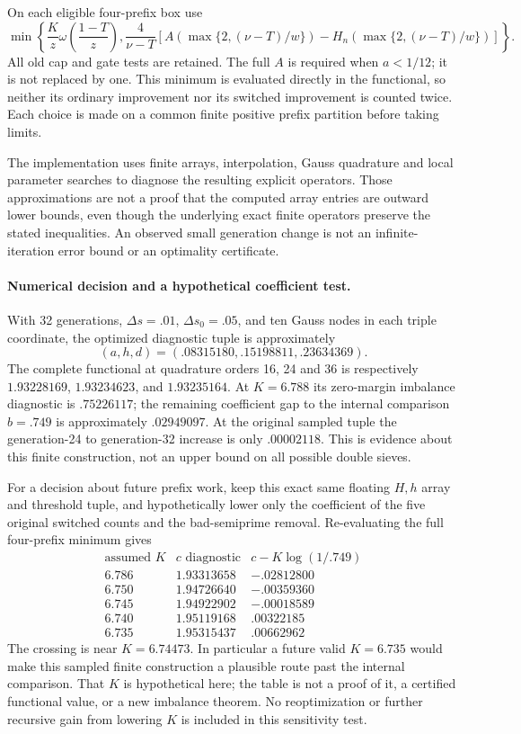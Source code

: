 \documentclass[11pt]{article}
\begin{document}
On each eligible four-prefix box use
\[
 \min\left\{\frac Kz\omega\left(\frac{1-T}{z}\right),
             \frac4{\nu-T}
               \left[A\left(\max\{2,(\nu-T)/w\}\right)
                     -H_n\left(\max\{2,(\nu-T)/w\}\right)\right]
       \right\}.
\]
All old cap and gate tests are retained. The full $A$ is required
when $a<1/12$; it is not replaced by one. This minimum is evaluated
directly in the functional, so neither its ordinary improvement nor
its switched improvement is counted twice. Each choice is made on
a common finite positive prefix partition before taking limits.

The implementation uses finite arrays, interpolation, Gauss
quadrature and local parameter searches to diagnose the resulting
explicit operators. Those approximations are not a proof that the
computed array entries are outward lower bounds, even though the
underlying exact finite operators preserve the stated inequalities.
An observed small generation change is not an infinite-iteration
error bound or an optimality certificate.

\paragraph{Numerical decision and a hypothetical coefficient test.}
With 32 generations, $\Delta s=.01$, $\Delta s_0=.05$, and ten
Gauss nodes in each triple coordinate, the optimized diagnostic tuple
is approximately
\[
 (a,h,d)=(.08315180,.15198811,.23634369).
\]
The complete functional at quadrature orders 16, 24 and 36 is
respectively $1.93228169$, $1.93234623$, and $1.93235164$.
At $K=6.788$ its zero-margin imbalance diagnostic is $.75226117$;
the remaining coefficient gap to the internal comparison $b=.749$
is approximately $.02949097$. At the original sampled tuple the
generation-24 to generation-32 increase is only $.00002118$.
This is evidence about this finite construction, not an upper bound
on all possible double sieves.

For a decision about future prefix work, keep this exact same
floating $H,h$ array and threshold tuple, and hypothetically lower
only the coefficient of the five original switched counts and the
bad-semiprime removal. Re-evaluating the full four-prefix minimum
gives
\[
\begin{array}{c|c|c}
 \text{assumed }K&c\text{ diagnostic}&c-K\log(1/.749)\\\hline
 6.786&1.93313658&-.02812800\\
 6.750&1.94726640&-.00359360\\
 6.745&1.94922902&-.00018589\\
 6.740&1.95119168& .00322185\\
 6.735&1.95315437& .00662962
\end{array}
\]
The crossing is near $K=6.74473$. In particular a future valid
$K=6.735$ would make this sampled finite construction a plausible
route past the internal comparison. That $K$ is hypothetical here;
the table is not a proof of it, a certified functional value, or a
new imbalance theorem. No reoptimization or further recursive gain
from lowering $K$ is included in this sensitivity test.
\end{document}
